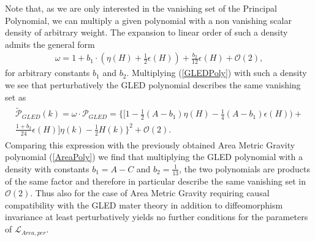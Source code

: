 \documentclass[a4paper,12pt, DIV=14, BCOR=5mm, twoside, headsepline, numbers=noenddot]{scrbook}
\begin{document}
Note that, as we are only interested in the vanishing set of the Principal Polynomial, we can multiply a given polynomial with a non vanishing scalar density of arbitrary weight. The expansion to linear order of such a density admits the general form
\begin{align}\label{dens}
\omega = 1+ b_1 \cdot (\eta(H) + \frac{1}{2} \epsilon(H)) + \frac{b_2}{12}\epsilon(H) + \mathcal{O}(2),
\end{align}
for arbitrary constants $b_1$ and $b_2$.
Multiplying  (\ref{GLEDPoly}) with such a density we see that perturbatively the GLED polynomial describes the same vanishing set as 
\begin{align} \label{GLEDPoly2}
\begin{aligned}
    \widetilde{\mathcal{P}}_{GLED}(k) = \omega \cdot \mathcal{P}_{GLED} = 
    \bigl\{  \bigl[ 1 - \frac{1}{2} (A-b_1) \eta(H) - \frac{1}{4} (A-b_1) \epsilon(H)) + \\ \frac{1+b_2}{24} \epsilon(H) \bigr] \eta(k)
    -\frac{1}{2} H(k)       \bigr\}^2 + \mathcal{O}(2).
\end{aligned}
\end{align}
Comparing this expression with the previously obtained Area Metric Gravity polynomial (\ref{AreaPoly}) we find that multiplying the GLED polynomial with a density with constants $b_1 = A -C$ and $b_2 = \frac{1}{13}$, the two polynomials are products of the same factor and therefore in particular describe the same vanishing set in $\mathcal{O}(2)$. Thus also for the case of Area Metric Gravity requiring causal compatibility with the GLED mater theory in addition to diffeomorphism invariance at least perturbatively yields no further conditions for the parameters of $\mathcal{L}_{Area,per}$.\\
\end{document}
